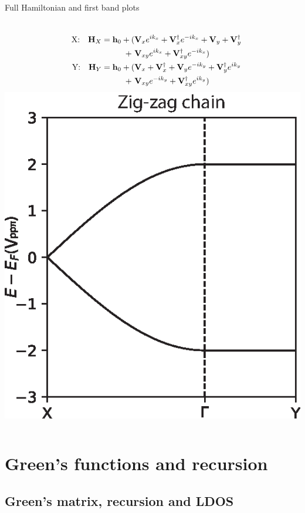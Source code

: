 \documentclass[hyperref={colorlinks=true,urlcolor=blue,linkcolor=.},aspectratio=1610,mathserif]{beamer}
\begin{document}
\begin{frame}{Full Hamiltonian and first band plots}
\begin{overprint}
\begin{columns}[c]
		\end{columns}
		\vspace{-.5cm}
		\begin{columns}[c]
			\begin{align}
				\qq{X:} \vb{H}_{X} = \vb{h}_0 + ( & \vb{V}_{x}e^{ik_x} + \vb{V}_{x}^{\dagger}e^{-ik_x} + \vb{V}_{y} + \vb{V}_{y}^{\dagger}\nonumber \\
				+\                                & \vb{V}_{xy}e^{ik_x} + \vb{V}_{xy}^{\dagger}e^{-ik_x}) \nonumber                                 \\
				\qq{Y:} \vb{H}_{Y} = \vb{h}_0 + ( & \vb{V}_{x} + \vb{V}_{x}^{\dagger} + \vb{V}_{y}e^{-ik_y} + \vb{V}_{y}^{\dagger}e^{ik_y}\nonumber \\
				+\                                & \vb{V}_{xy}e^{-ik_y} + \vb{V}_{xy}^{\dagger}e^{ik_y}) \nonumber
			\end{align}
			\includegraphics[width=.8\textwidth]{Figures/Beta2.eps}
		\end{columns}
	\end{overprint}
\end{frame}

\section{Green's functions and recursion}
\subsection{Green's matrix, recursion and LDOS}
\end{document}

